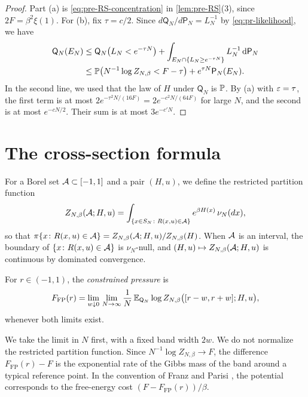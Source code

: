 \begin{proof}
Part (a) is \eqref{eq:pre-RS-concentration} in \cref{lem:pre-RS}(3), since $2F=\beta^2\xi(1)$. For (b), fix $\tau=c/2$. Since $d\mathsf Q_N/d\mathsf P_N=L_N^{-1}$ by \eqref{eq:pr-likelihood}, we have
\begin{align*}
\mathsf Q_N(E_N)
&\le\mathsf Q_N\bigl(L_N<e^{-\tau N}\bigr)+\int_{E_N\cap\{L_N\ge e^{-\tau N}\}}L_N^{-1}\,\mathrm d\mathsf P_N\\
&\le\mathbb P\bigl(N^{-1}\log Z_{N,\beta}<F-\tau\bigr)+e^{\tau N}\mathsf P_N(E_N).
\end{align*}
In the second line, we used that the law of $H$ under $\mathsf Q_N$ is $\mathbb P$. By (a) with $\varepsilon=\tau$, the first term is at most $2e^{-\tau^2N/(16F)}=2e^{-c^2N/(64F)}$ for large $N$, and the second is at most $e^{-cN/2}$. Their sum is at most $3e^{-c'N}$.
\end{proof}


\section{The cross-section formula}\label{sec:pr-cross}

For a Borel set $\mathcal A\subset[-1,1]$ and a pair $(H,u)$, we define the restricted partition function
\[
Z_{N,\beta}(\mathcal A;H,u)=\int_{\{x\in S_N\colon R(x,u)\in\mathcal A\}}e^{\beta H(x)}\,\nu_N(dx),
\]
so that $\pi\{x\colon R(x,u)\in\mathcal A\}=Z_{N,\beta}(\mathcal A;H,u)/Z_{N,\beta}(H)$. When $\mathcal A$ is an interval, the boundary of $\{x\colon R(x,u)\in\mathcal A\}$ is $\nu_N$-null, and $(H,u)\mapsto Z_{N,\beta}(\mathcal A;H,u)$ is continuous by dominated convergence.

\begin{definition}\label{def:pr-FP}
For $r\in(-1,1)$, the \emph{constrained pressure} is
\[
F_{\mathrm{FP}}(r)=\lim_{w\downarrow0}\,\lim_{N\to\infty}\frac1N\,\mathbb E_{\mathsf Q_N}\log Z_{N,\beta}\bigl([r-w,r+w];H,u\bigr),
\]
whenever both limits exist.
\end{definition}

We take the limit in $N$ first, with a fixed band width $2w$. We do not normalize the restricted partition function. Since $N^{-1}\log Z_{N,\beta}\to F$, the difference $F_{\mathrm{FP}}(r)-F$ is the exponential rate of the Gibbs mass of the band around a typical reference point. In the convention of Franz and Parisi \cite[Section~3, Eqs.~(12)--(14)]{FranzParisi1995}, the potential corresponds to the free-energy cost $(F-F_{\mathrm{FP}}(r))/\beta$.

